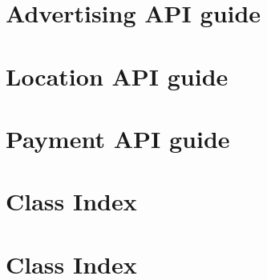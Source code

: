 \documentclass[a4paper]{book}
\begin{document}
\chapter{Advertising API guide}
\label{blv_ad_guide}
\hypertarget{blv_ad_guide}{}

\chapter{Location API guide}
\label{blv_location_guide}
\hypertarget{blv_location_guide}{}

\chapter{Payment API guide}
\label{blv_payment_guide}
\hypertarget{blv_payment_guide}{}

\chapter{Class Index}

\chapter{Class Index}

\end{document}

